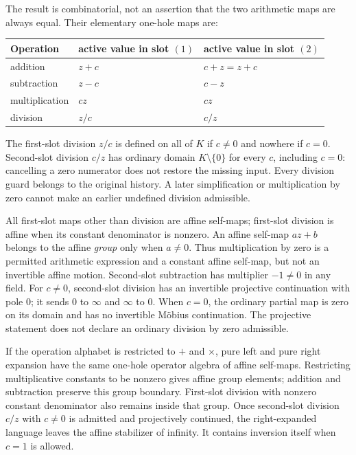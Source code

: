 The result is combinatorial, not an assertion that the two arithmetic maps are
always equal.  Their elementary one-hole maps are:

\begin{center}
\renewcommand{\arraystretch}{1.35}
\begin{tabular}{lll}
\toprule
Operation & active value in slot $(1)$ & active value in slot $(2)$ \\
\midrule
addition & $z+c$ & $c+z=z+c$ \\
subtraction & $z-c$ & $c-z$ \\
multiplication & $cz$ & $cz$ \\
division & $z/c$ & $c/z$ \\
\bottomrule
\end{tabular}
\end{center}

The first-slot division $z/c$ is defined on all of $K$ if $c\ne0$ and
nowhere if $c=0$.  Second-slot division $c/z$ has ordinary domain
$K\setminus\{0\}$ for every $c$, including $c=0$: cancelling a zero
numerator does not restore the missing input.  Every division guard belongs
to the original history.  A later simplification or multiplication by zero
cannot make an earlier undefined division admissible.

All first-slot maps other than division are affine self-maps; first-slot
division is affine when its constant denominator is nonzero.  An affine
self-map $az+b$ belongs to the affine \emph{group} only when $a\ne0$.
Thus multiplication by zero is a permitted arithmetic expression and a
constant affine self-map, but not an invertible affine motion.  Second-slot
subtraction has multiplier $-1\ne0$ in any field.  For $c\ne0$,
second-slot division has an invertible projective continuation with pole
$0$; it sends $0$ to $\infty$ and $\infty$ to $0$.  When $c=0$, the
ordinary partial map is zero on its domain and has no invertible
M\"obius continuation.  The projective statement does not declare an
ordinary division by zero admissible.

\begin{corollary}
\label{cor:p0-affine-projective-break}
If the operation alphabet is restricted to $+$ and $\times$, pure left and
pure right expansion have the same one-hole operator algebra of affine
self-maps.  Restricting multiplicative constants to be nonzero gives affine
group elements; addition and subtraction preserve this group boundary.
First-slot division with nonzero constant denominator also remains inside
that group.  Once second-slot division $c/z$ with $c\ne0$ is admitted
and projectively continued, the right-expanded language leaves the affine
stabilizer of infinity.  It contains inversion itself when $c=1$ is allowed.
\end{corollary}

